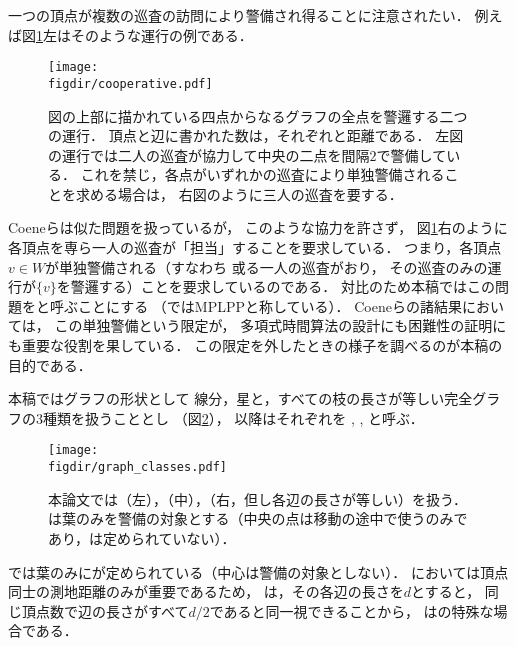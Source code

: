 一つの頂点が複数の巡査の訪問により警備され得ることに注意されたい．
例えば図\ref{figure: cooperative}左はそのような運行の例である．
\begin{figure}
  \begin{center}
    \texttt{[image: \\figdir/cooperative.pdf]}
    \caption{図の上部に描かれている四点からなるグラフの全点を警邏する二つの運行．
      頂点と辺に書かれた数は，それぞれ{\maxIdletime}と距離である．
      左図の運行では二人の巡査が協力して中央の二点を間隔$2$で警備している．
      これを禁じ，各点がいずれかの巡査により単独警備されることを求める場合は，
      右図のように三人の巡査を要する．}
    \label{figure: cooperative}
  \end{center}
\end{figure}
Coeneら\cite{coene2011charlemagne}は似た問題を扱っているが，
このような協力を許さず，
図\ref{figure: cooperative}右のように
各頂点を専ら一人の巡査が「担当」することを要求している．
つまり，各頂点$v \in W$が単独警備される（すなわち
或る一人の巡査がおり，
その巡査のみの運行が$\{v\}$を警邏する）ことを要求しているのである．
対比のため本稿ではこの問題を{\independentPatProb}と呼ぶことにする
（\cite{coene2011charlemagne}ではMPLPPと称している）．
Coeneら\cite{coene2011charlemagne}の諸結果においては，
この単独警備という限定が，
多項式時間算法の設計にも困難性の証明にも重要な役割を果している．
この限定を外したときの様子を調べるのが本稿の目的である．

本稿ではグラフの形状として
線分，星と，すべての枝の長さが等しい完全グラフの3種類を扱うこととし
（図\ref{figure: graph_classes}），
以降はそれぞれを {\graphLine}, {\graphStar}, {\graphUnit}と呼ぶ．
\begin{figure}
  \begin{center}
    \texttt{[image: \\figdir/graph\_classes.pdf]}
    \caption{本論文では{\graphLine}（左），{\graphStar}（中），{\graphUnit}（右，但し各辺の長さが等しい）を扱う．{\graphStar}は葉のみを警備の対象とする（中央の点は移動の途中で使うのみであり，{\maxIdletime}は定められていない）．}
    \label{figure: graph_classes}
  \end{center}
\end{figure}
{\graphStar}では葉のみに{\maxIdletime}が定められている（中心は警備の対象としない）．
{\patProb}においては頂点同士の測地距離のみが重要であるため，
{\graphUnit}は，その各辺の長さを$d$とすると，
同じ頂点数で辺の長さがすべて$d/2$である{\graphStar}と同一視できることから，
{\graphUnit}は{\graphStar}の特殊な場合である．


